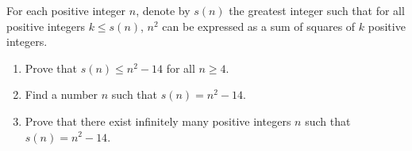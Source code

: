 For each positive integer $n$, denote by $s(n)$ the greatest integer such that for all positive integers $k \leq s(n)$, $n^2$ can be expressed as a sum of squares of $k$ positive integers.
\begin{enumerate}
\item[(a)] Prove that $s(n) \leq n^2 - 14$ for all $n \geq 4$.
\item[(b)] Find a number $n$ such that $s(n) = n^2 - 14$.
\item[(c)] Prove that there exist infinitely many positive integers $n$ such that $s(n) = n^2 - 14$.
\end{enumerate}
